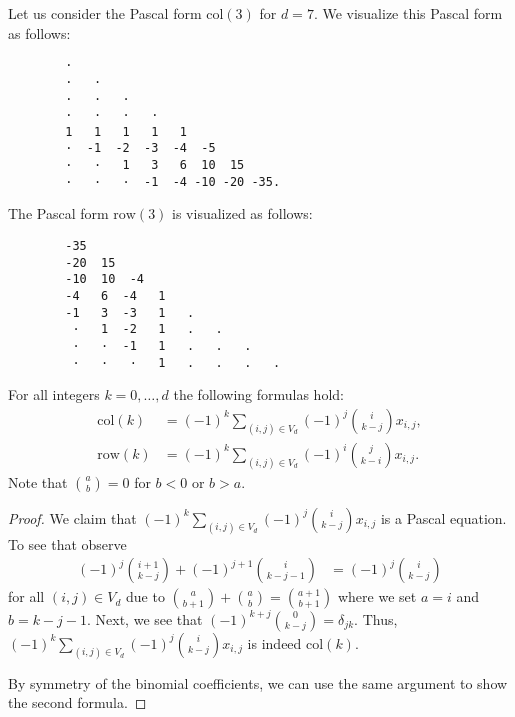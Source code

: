 \begin{example}
    Let us consider the Pascal form \( \mathrm{col}(3) \) for \( d = 7 \). We visualize this Pascal form as follows: 
    \begin{verbatim}
        · 
        ·   · 
        ·   ·   · 
        ·   ·   ·   · 
        1   1   1   1   1 
        ·  -1  -2  -3  -4  -5 
        ·   ·   1   3   6  10  15 
        ·   ·   ·  -1  -4 -10 -20 -35.
    \end{verbatim}

    The Pascal form \( \mathrm{row}(3) \) is visualized as follows:
    \begin{verbatim}
        -35 
        -20  15 
        -10  10  -4 
        -4   6  -4   1 
        -1   3  -3   1   . 
         ·   1  -2   1   .   . 
         ·   ·  -1   1   .   .   . 
         ·   ·   ·   1   .   .   .   .
    \end{verbatim}
\end{example}

\begin{proposition}\label{prop:pascal-formulas}
    For all integers \( k = 0, \dots, d \) the following formulas hold:
    \begin{align*}
        \mathrm{col}(k)  &= (-1)^k \sum_{(i,j) \in V_d} (-1)^j \binom{i}{k-j} x_{i,j}, \\
        \mathrm{row}(k) &= (-1)^k \sum_{(i,j) \in V_d} (-1)^i \binom{j}{k-i} x_{i,j}.
    \end{align*} 
    Note that \( \binom{a}{b} = 0 \) for \( b < 0 \) or \( b > a \).
\end{proposition}

\begin{proof}
    We claim that \( (-1)^k \sum_{(i,j) \in V_d} (-1)^j \binom{i}{k-j} x_{i,j} \) is a Pascal equation. To see that observe 
    \begin{align*}
        (-1)^j \binom{i+1}{k-j} + (-1)^{j+1} \binom{i}{k-j-1} &= (-1)^j \binom{i}{k-j}
    \end{align*}
    for all \( (i,j) \in V_{d} \) due to \(  \binom{a}{b+1} + \binom{a}{b} = \binom{a+1}{b+1} \) where we set \( a = i \) and \( b = k-j-1 \). Next, we see that \( (-1)^{k+j} \binom{0}{k-j} = \delta_{jk} \). Thus, \( (-1)^k \sum_{(i,j) \in V_d} (-1)^j \binom{i}{k-j} x_{i,j} \) is indeed \( \mathrm{col}(k) \).

    By symmetry of the binomial coefficients, we can use the same argument to show the second formula.
\end{proof}

